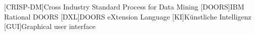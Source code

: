 
\begin{acronym}
	[CRISP-DM]{Cross Industry Standard Process for Data Mining}
	[DOORS]{IBM Rational DOORS}
	[DXL]{DOORS eXtension Language}
	[KI]{Künstliche Intelligenz}
	[GUI]{Graphical user interface}
\end{acronym}



